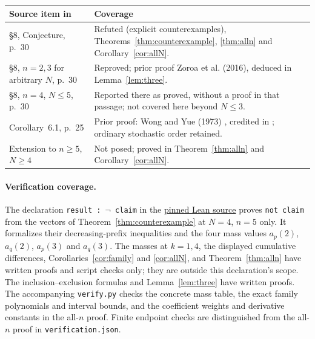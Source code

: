 \documentclass[11pt,a4paper]{article}
\begin{document}
\begin{center}
\begin{tabular}{p{.47\linewidth}p{.44\linewidth}}
\toprule
Source item in \cite{zoroa} & Coverage\\
\midrule
\S8, Conjecture, p.~30 & Refuted (explicit counterexamples),
Theorems~\ref{thm:counterexample}, \ref{thm:alln} and Corollary~\ref{cor:allN}.\\
\S8, $n=2,3$ for arbitrary $N$, p.~30 &
Reproved; prior proof Zoroa et al. (2016), deduced in Lemma~\ref{lem:three}.\\
\S8, $n=4$, $N\leq5$, p.~30 &
Reported there as proved, without a proof in that passage;
not covered here beyond $N\leq3$.\\
Corollary~6.1, p.~25 &
Prior proof: Wong and Yue (1973) \cite[pp.~391--398]{wongyue},
credited in \cite[Remark~6.1, pp.~25--26]{zoroa};
ordinary stochastic order retained.\\
Extension to $n\geq5$, $N\geq4$ &
Not posed; proved in Theorem~\ref{thm:alln} and Corollary~\ref{cor:allN}.\\
\bottomrule
\end{tabular}
\end{center}

\paragraph{Verification coverage.}
The declaration \texttt{result : $\neg$ claim} in the
\href{https://github.com/the-omega-institute/trureturing/blob/ad59550e53d607f9e9dbd8110a79414c46e97f7e/D5/S3/Analytic/Probability/StrongDominanceRefutation.lean}{pinned Lean source}
proves \texttt{not claim} from the vectors of
Theorem~\ref{thm:counterexample} at $N=4$, $n=5$ only.
It formalizes their decreasing-prefix inequalities and the four mass
values $a_p(2)$, $a_q(2)$, $a_p(3)$ and $a_q(3)$.
The masses at $k=1,4$, the displayed cumulative differences,
Corollaries~\ref{cor:family} and \ref{cor:allN}, and
Theorem~\ref{thm:alln} have written proofs and script checks only;
they are outside this declaration's scope.
The inclusion--exclusion formulas and Lemma~\ref{lem:three} have written
proofs. The accompanying \texttt{verify.py} checks the concrete
mass table, the exact family polynomials and interval bounds, and the
coefficient weights and derivative constants in the all-$n$ proof.
Finite endpoint checks are distinguished from the all-$n$ proof in
\texttt{verification.json}.
\end{document}
